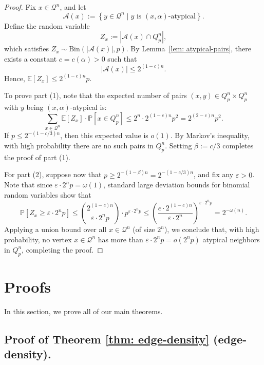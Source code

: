 \documentclass[11pt]{article}
\theoremstyle{definition}
\theoremstyle{plain}
\begin{document}
\begin{proof}
Fix \( x \in \mathcal{Q}^n \), and let
\[
\mathcal{A}(x) := \left\{ y \in \mathcal{Q}^n \mid y \text{ is } (x, \alpha)\text{-atypical} \right\}.
\]
Define the random variable
\[
Z_x := |\mathcal{A}(x) \cap Q_p^n|,
\]
which satisfies \( Z_x \sim \mathrm{Bin}(|\mathcal{A}(x)|, p) \). By Lemma~\ref{lem: atypical-pairs}, there exists a constant \( c = c(\alpha) > 0 \) such that
\[
|\mathcal{A}(x)| \leq 2^{(1 - c)n}.
\]
Hence,
\(
\mathbb{E}[Z_x] \leq 2^{(1 - c)n} p.
\)

\smallskip

To prove part (1), note that the expected number of pairs \( (x, y) \in Q_p^n \times Q_p^n \) with \( y \) being $(x,\alpha)$-atypical is:
\[
\sum_{x \in \mathcal{Q}^n} \mathbb{E}[Z_x] \cdot \mathbb{P}[x \in Q_p^n] \leq 2^n \cdot 2^{(1 - c)n} p^2 = 2^{(2 - c)n} p^2.
\]
If \( p \leq 2^{-(1 - c/3)n} \), then this expected value is \( o(1) \). By Markov’s inequality, with high probability there are no such pairs in \( Q_p^n \). Setting \( \beta := c/3 \) completes the proof of part (1).

\smallskip

For part (2), suppose now that \( p \geq 2^{-(1 - \beta)n} = 2^{-(1 - c/3)n} \), and fix any \( \varepsilon > 0 \). Note that since \( \varepsilon \cdot 2^n p = \omega(1) \), standard large deviation bounds for binomial random variables show that
\[
\mathbb{P}\left[ Z_x \geq \varepsilon \cdot 2^n p \right] 
\leq \binom{2^{(1 - c)n}}{\varepsilon \cdot 2^n p} \cdot p^{\varepsilon \cdot 2^n p}
\leq \left( \frac{e \cdot 2^{(1 - c)n}}{\varepsilon \cdot 2^n} \right)^{\varepsilon \cdot 2^n p}
= 2^{-\omega(n)}.
\]
Applying a union bound over all \( x \in \mathcal{Q}^n \) (of size \( 2^n \)), we conclude that, with high probability, no vertex \( x \in \mathcal{Q}^n \) has more than \( \varepsilon \cdot 2^n p = o(2^n p) \) atypical neighbors in \( Q_p^n \), completing the proof.
\end{proof}




\section{Proofs}

In this section, we prove all of our main theorems. 

\subsection{Proof of Theorem \ref{thm: edge-density} (edge-density).}
\end{document}
